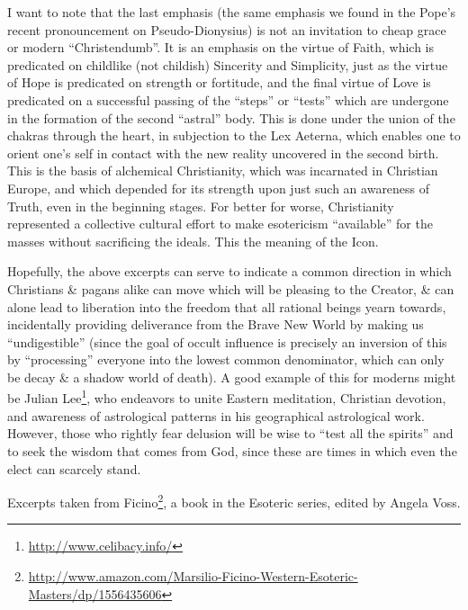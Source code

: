 I want to note that the last emphasis (the same emphasis we found in the Pope's recent pronouncement on Pseudo-Dionysius) is not an invitation to cheap grace or modern ``Christendumb''. It is an emphasis on the virtue of Faith, which is predicated on childlike (not childish) Sincerity and Simplicity, just as the virtue of Hope is predicated on strength or fortitude, and the final virtue of Love is predicated on a successful passing of the ``steps'' or ``tests'' which are undergone in the formation of the second ``astral'' body. This is done under the union of the chakras through the heart, in subjection to the Lex Aeterna, which enables one to orient one's self in contact with the new reality uncovered in the second birth. This is the basis of alchemical Christianity, which was incarnated in Christian Europe, and which depended for its strength upon just such an awareness of Truth, even in the beginning stages. For better for worse, Christianity represented a collective cultural effort to make esotericism ``available'' for the masses without sacrificing the ideals. This the meaning of the Icon.

Hopefully, the above excerpts can serve to indicate a common direction in which Christians \& pagans alike can move which will be pleasing to the Creator, \& can alone lead to liberation into the freedom that all rational beings yearn towards, incidentally providing deliverance from the Brave New World by making us ``undigestible'' (since the goal of occult influence is precisely an inversion of this by ``processing'' everyone into the lowest common denominator, which can only be decay \& a shadow world of death). A good example of this for moderns might be Julian Lee\footnote{\url{http://www.celibacy.info/}}, who endeavors to unite Eastern meditation, Christian devotion, and awareness of astrological patterns in his geographical astrological work. However, those who rightly fear delusion will be wise to ``test all the spirits'' and to seek the wisdom that comes from God, since these are times in which even the elect can scarcely stand.

Excerpts taken from Ficino\footnote{\url{http://www.amazon.com/Marsilio-Ficino-Western-Esoteric-Masters/dp/1556435606}}, a book in the Esoteric series, edited by Angela Voss.




